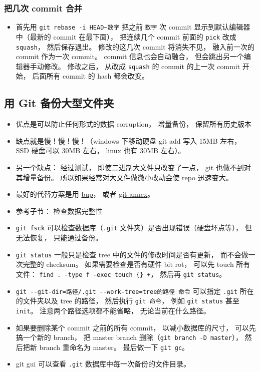 \subsubsection{把几次 commit 合并}
\begin{itemize}
\item 首先用 \verb|git rebase -i HEAD~数字| 把之前 \verb|数字| 次 commit 显示到默认编辑器中（最新的 commit 在最下面）， 把连续几个 commit 前面的 \verb|pick| 改成 \verb|squash|， 然后保存退出。 修改的这几次 commit 将消失不见， 融入前一次的 commit 作为一次 commit。 commit 信息也会自动融合， 但会跳出另一个编辑器手动修改。 修改之后， 从改成 \verb|squash| 的 commit 的上一次 commit 开始， 后面所有 commit 的 hash 都会改变。
\end{itemize}


\subsection{用 Git 备份大型文件夹}
\begin{itemize}
\item 优点是可以防止任何形式的数据 corruption， 增量备份， 保留所有历史版本
\item 缺点就是慢！慢！慢！（windows 下移动硬盘 git add 写入 15MB 左右， SSD 硬盘可以 30MB 左右， linux 也有 30MB 左右）。
\item 另一个缺点： 经过测试， 即使二进制大文件只改变了一点， git 也做不到对其增量备份。 所以如果经常对大文件做微小改动会使 repo 迅速变大。
\item 最好的代替方案是用 \href{https://bup.github.io/}{bup}， 或者 \href{https://git-annex.branchable.com/}{git-annex}。
\item 参考子节： 检查数据完整性
\item \verb|git fsck| 可以检查数据库（\verb|.git| 文件夹）是否出现错误（硬盘坏点等）， 但无法恢复， 只能通过备份。
\item \verb|git status| 一般只是检查 tree 中的文件的修改时间是否有更新， 而不会做一次完整的 checksum。 如果需要检查是否有硬件 bit rot， 可以先 touch 所有文件： \verb|find . -type f -exec touch {} +|， 然后再 \verb|git status|。
\item \verb|git --git-dir=路径/.git --work-tree=tree的路径 命令| 可以指定 \verb|.git| 所在的文件夹以及 tree 的路径， 然后执行 \verb|git 命令|， 例如 \verb|git status| 甚至 \verb|init|。 注意两个路径选项都不能省略， 无论当前在什么路径。
\item 如果要删除某个 commit 之前的所有 commit， 以减小数据库的尺寸， 可以先搞一个新的 branch， 把 master branch 删除（\verb|git branch -D master|）， 然后把新 branch 重命名为 master。 最后做一下 \verb|git gc|。
\item git gui 可以查看 \verb|.git| 数据库中每一次备份的文件目录。
\end{itemize}

